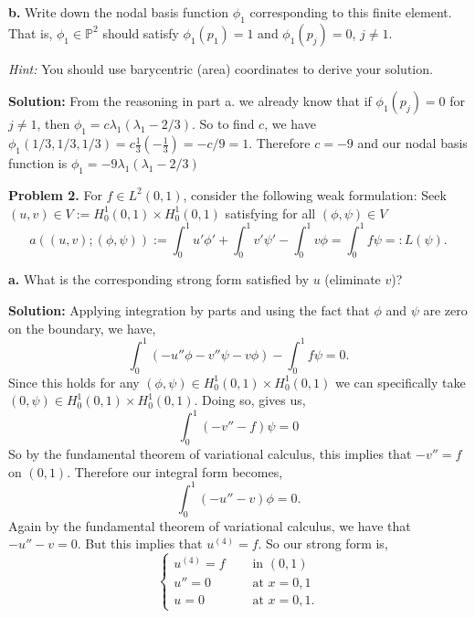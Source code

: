 \documentclass[11pt]{article}
\begin{document}
\vskip 2cm


\textbf{b.} Write down the nodal basis function $\phi_1$ corresponding to this finite element.
That is, $\phi_1 \in \mathbb{P}^2$ should satisfy $\phi_1(p_1) = 1$ and $\phi_1(p_j) = 0$, $j \neq 1$.

\textit{Hint:} You should use barycentric (area) coordinates to derive your solution.


\vskip 1cm


\textbf{Solution:} From the reasoning in part a. we already know that if $\phi_1(p_j) = 0$ for $j\neq 1$, then $\phi_1 = c\lambda_1(\lambda_1 - 2/3)$.
So to find $c$, we have $\phi_1(1/3, 1/3, 1/3) = c \frac{1}{3}(-\frac{1}{3}) = -c/9 = 1$.
Therefore $c = -9$ and our nodal basis function is $\phi_1 = -9\lambda_1(\lambda_1 - 2/3)$

\vskip 2cm


\textbf{Problem 2.} For $f\in L^2(0,1)$, consider the following  weak formulation: Seek  $(u,v)\in V := H^1_0(0,1)\times H^1_0(0,1)$ satisfying for all $(\phi,\psi)\in V$
\begin{equation}
    a((u,v); (\phi, \psi)) := \int_0^1 u' \phi' + \int_0^1 v' \psi' - \int_0^1 v \phi = \int_0^1 f\psi =: L(\psi).
\end{equation}

\vskip 1cm


\textbf{a.}  What is the corresponding strong form satisfied by $u$ (eliminate $v$)?

\vskip 1cm


\textbf{Solution:} Applying integration by parts and using the fact that $\phi$ and $\psi$ are zero on the boundary, we have,
\begin{equation*}
    \int_0^1 (- u''\phi - v''\psi - v\phi) - \int_0^1 f \psi = 0. 
\end{equation*}
Since this holds for any $(\phi, \psi) \in H^1_0(0,1) \times H^1_0(0,1)$ we can specifically take $(0, \psi) \in H^1_0(0,1) \times H^1_0(0,1)$.
Doing so, gives us,
\begin{equation*}
    \int_0^1 (-v'' - f) \psi = 0
\end{equation*}
So by the fundamental theorem of variational calculus, this implies that $-v'' = f$ on $(0,1)$.
Therefore our integral form becomes,
\begin{equation*}
    \int_0^1 (-u'' - v)\phi = 0.
\end{equation*}
Again by the fundamental theorem of variational calculus, we have that $-u'' - v = 0$. 
But this implies that $u^{(4)} = f$.
So our strong form is,
\begin{equation*}
    \begin{cases}
        u^{(4)} = f &\quad \text{ in } (0,1) \\
        u'' = 0 &\quad \text{ at } x = 0,1 \\
        u = 0 &\quad \text{ at } x = 0, 1.
    \end{cases}
\end{equation*}
 
\end{document}
